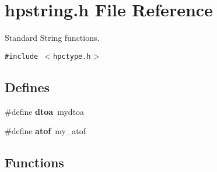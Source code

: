 \section{hpstring.h File Reference}
\label{hpstring_8h}
Standard String functions. 


{\tt \#include $<$hpctype.h$>$}\par
\subsection*{Defines}
\begin{CompactItemize}
\item 
\#define {\bf dtoa}\ mydtoa
\item 
\#define {\bf atof}\ my\_\-atof
\end{CompactItemize}
\subsection*{Functions}
